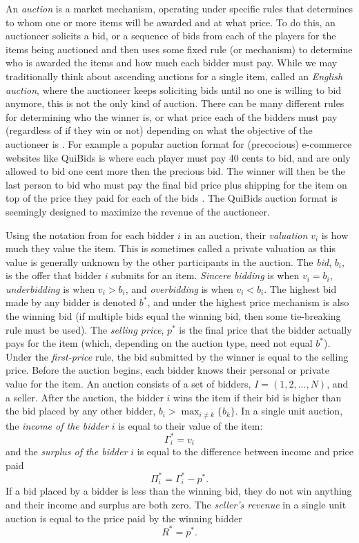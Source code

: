 \documentclass[12pt,twoside]{reedthesis}
\begin{document}
An \textit{auction} is a market mechanism, operating under specific rules that determines to whom one or more items will be awarded and at what price. To do this, an auctioneer solicits a bid, or a sequence of bids from each of the players for the items being auctioned and then uses some fixed rule (or mechanism) to determine who is awarded the items and how much each bidder must pay. While we may traditionally think about ascending auctions for a single item, called an {\em English auction}, where the auctioneer keeps soliciting bids until no one is willing to bid anymore, this is not the only kind of auction. There can be many different rules for determining who the winner is, or what price each of the bidders must pay (regardless of if they win or not) depending on what the objective of the auctioneer is \citep{Mochon2015}. For example a popular auction format for (precocious) e-commerce websites like QuiBids is where each player must pay 40 cents to bid, and are only allowed to bid one cent more then the precious bid. The winner will then be the last person to bid who must pay the final bid price plus shipping for the item on top of the price they paid for each of the bids \citep{QuiBids}. The QuiBids auction format is seemingly designed to maximize the revenue of the auctioneer.

 Using the notation from \cite{Mochon2015} for each bidder $i$ in an auction, their {\em  valuation} $v_i$ is how much they value the item. This is sometimes called a private valuation as this value is generally unknown by the other participants in the auction. The \textit{bid}, $b_i$, is the offer that bidder $i$ submits for an item. {\em Sincere bidding} is when $v_i = b_i$, {\em underbidding} is when $v_i > b_i$, and {\em overbidding} is when $v_i < b_i$. The highest bid made by any bidder is denoted $b^*$, and under the highest price mechanism is also the winning bid (if multiple bids equal the winning bid, then some tie-breaking rule must be used). The \textit{selling price}, $p^*$ is the final price that the bidder actually pays for the item (which, depending on the auction type, need not equal $b^*$). Under the \textit{first-price} rule, the bid submitted by the winner is equal to the selling price. Before the auction begins, each bidder knows their personal or private value for the item. An auction consists of a set of bidders, $I = (1,2, ...,N)$, and a seller. After the auction, the bidder $i$ wins the item if their bid is higher than the bid placed by any other bidder, $b_i > \max_{i \neq k} \{b_k\}$. In a single unit auction, the {\em income of the bidder} $i$ is equal to their value of the item: $$ \Gamma_i^* = v_i$$ and the {\em surplus of the bidder} $i$ is equal to the difference between income and price paid $$ \Pi_i^* = \Gamma_i^* - p^*.$$ If a bid placed by a bidder is less than the winning bid, they do not win anything and their income and surplus are both zero. The {\em seller's revenue} in a single unit auction is equal to the price paid by the winning bidder $$ R^* = p^*.$$ 
\end{document}
